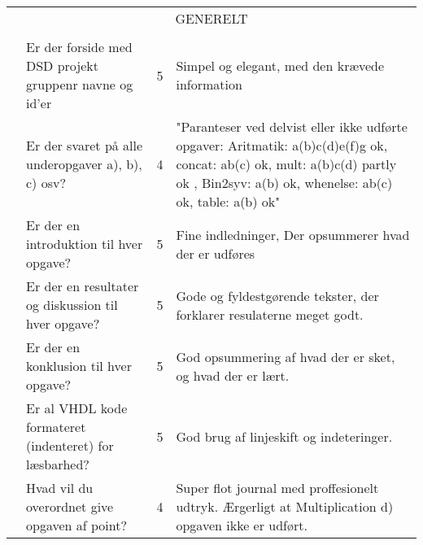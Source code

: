 \begin{table}[h]
    \small
    \begin{tabularx}{\textwidth}{p{3.5cm}Xp{5mm}X} &                                                        &                                                                          \\\midrule
        \multicolumn{4}{c}{GENERELT}                                                                                                                                       \\\midrule
                                       &                                                        &   &                                                                      \\
                                       & Er der forside med DSD projekt gruppenr navne og id'er & 5 &Simpel og elegant, med den krævede information                                \\
                                       & Er der svaret på alle underopgaver a), b), c) osv?     & 4 & "Paranteser ved delvist eller ikke udførte opgaver: 
                                       Aritmatik: a(b)c(d)e(f)g ok, concat: ab(c) ok, mult: a(b)c(d) partly ok , Bin2syv: a(b) ok, whenelse: ab(c) ok, table: a(b) ok"                                           \\
                                       & Er der en introduktion til hver opgave?                & 5 &Fine indledninger, Der opsummerer hvad der er udføres \\
                                       & Er der en resultater og diskussion til hver opgave?    & 5 & Gode og fyldestgørende tekster, der forklarer resulaterne meget godt.                 \\
                                       & Er der en konklusion til hver opgave?                  & 5 & God opsummering af hvad der er sket, og hvad der er lært.                 \\
                                       & Er al VHDL kode formateret (indenteret) for læsbarhed? & 5 & God brug af linjeskift og indeteringer.                 \\
                                       & Hvad vil du overordnet give opgaven af point?          & 4 & Super flot journal med proffesionelt udtryk. Ærgerligt at Multiplication d) opgaven ikke er udført.                  \\ \bottomrule
    \end{tabularx}
\end{table}


